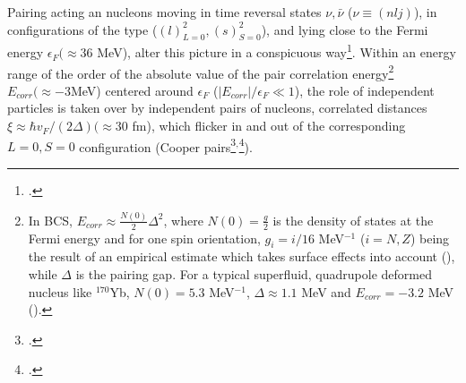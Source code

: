 Pairing acting an nucleons moving in time reversal states $\nu,\bar\nu$ ($\nu\equiv(nlj)$), in configurations of the type ($(l)^2_{L=0},(s)^2_{S=0}$), and lying close to the Fermi energy $\epsilon_F(\approx 36$ MeV), alter this picture in a conspicuous way\footnote{\cite{Broglia:13}.}. Within an energy range of the order of the absolute value of the pair correlation energy\footnote{In BCS, $E_{corr}\approx\frac{N(0)}{2}\Delta^2$, where $N(0)=\frac{g}{2}$ is the density of states at the Fermi energy and for one spin orientation, $g_i=i/16$ MeV$^{-1}$ ($i=N,Z$) being the result of an empirical estimate which takes surface effects into account (\cite{Bohr:75,Bortignon:98}), while $\Delta$ is the pairing gap. For a typical superfluid, quadrupole deformed nucleus like $^{170}$Yb, $N(0)=5.3$ MeV$^{-1}$, $\Delta\approx1.1$ MeV and $E_{corr}=-3.2$ MeV (\cite{Shimizu:89}).} $E_{corr}(\approx-3 $MeV) centered around $\epsilon_F$ ($|E_{corr}|/\epsilon_F\ll1$), the role of independent particles is taken over by independent pairs of nucleons, correlated distances $\xi\approx\hbar v_F/(2\Delta)(\approx 30$ fm), which flicker in and out of the corresponding $L=0, S=0$ configuration (Cooper pairs\footnote{\cite{Cooper:56}.}$^{,}$\footnote{\cite{Brink:05}.}).


